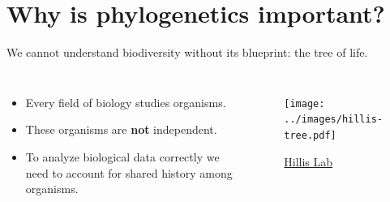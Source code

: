 \section{Why is phylogenetics important?}






\begin{frame}[t]
    \begin{adjustwidth}{-1.5em}{-1.5em}
    We cannot understand biodiversity without its blueprint: the tree of life.
    \begin{columns}


        \begin{itemize}[<+->]
            \item Every field of biology studies organisms.
            \item These organisms are \textbf{not} independent.
            \item To analyze biological data correctly we need to account for
                shared history among organisms.
        \end{itemize}

        \begin{figure}
            \begin{center}
            \texttt{[image: ../images/hillis-tree.pdf]}
            \caption{\tiny \href{http://www.zo.utexas.edu/faculty/antisense/downloadfilestol.html}{Hillis Lab}}
            \end{center}
        \end{figure}
    
    \end{columns}
    \end{adjustwidth}
\end{frame}

